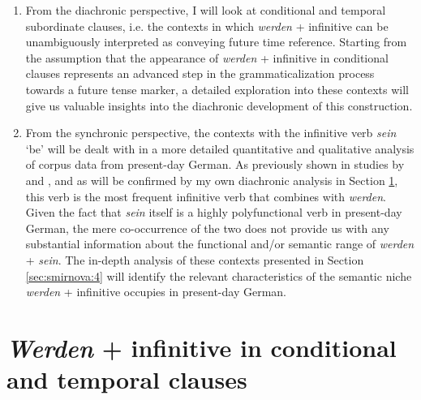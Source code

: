 \documentclass[output=paper,colorlinks,citecolor=brown]{langscibook}
\begin{document}
\begin{enumerate}
  \item From the diachronic perspective, I will look at conditional and temporal subordinate clauses, i.e. the contexts in which \emph{werden} + infinitive can be unambiguously interpreted as conveying future time reference. Starting from the assumption that the appearance of \emph{werden} + infinitive in conditional clauses represents an advanced step in the grammaticalization process towards a future tense marker, a detailed exploration into these contexts will give us valuable insights into the diachronic development of this construction.
  \item From the synchronic perspective, the contexts with the infinitive verb \emph{sein} `be' will be dealt with in a more detailed quantitative and qualitative analysis of corpus data from present-day German. As previously shown in studies by \citet{Hilpert2008} and \citet{Hartmann2021}, and as will be confirmed by my own diachronic analysis in Section \ref{sec:smirnova:3}, this verb is the most frequent infinitive verb that combines with \emph{werden}. Given the fact that \emph{sein} itself is a highly polyfunctional verb in present-day German, the mere co-occurrence of the two does not provide us with any substantial information about the functional and/or semantic range of \emph{werden} + \emph{sein}. The in-depth analysis of these contexts presented in Section \ref{sec:smirnova:4} will identify the relevant characteristics of the semantic niche \emph{werden} + infinitive occupies in present-day German.
\end{enumerate}

\section{\emph{Werden} + infinitive in conditional and temporal clauses} \label{sec:smirnova:3}
\end{document}
